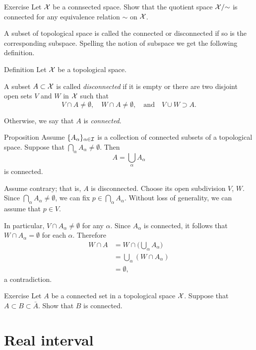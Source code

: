 \begin{thm}{Exercise}\label{ex:quotient-connected}
Let $\mathcal{X}$ be a connsected space.
Show that the quotient space $\mathcal{X}/{\sim}$ is connected for any equivalence relation $\sim$ on $\mathcal{X}$.
\end{thm}

A subset of topological space is called the connected or disconnected if so is the corresponding subspace.
Spelling the notion of subspace we get the following definition.

\begin{thm}{Definition}
Let $\mathcal{X}$ be a topological space.

A subset $A\subset \mathcal{X}$ is called \emph{disconnected} if it is empty or there are two disjoint open sets $V$ and $W$ in $\mathcal{X}$ such that 
\[V\cap A\ne\emptyset,\quad W\cap A\ne\emptyset,\quad\text{and}\quad V\cup W\supset A.\]

Otherwise, we say that $A$ is \emph{connected}.
\end{thm}

\begin{thm}{Proposition}\label{prop:union-connect}
Assume $\{A_\alpha\}_{\alpha\in\mathcal{I}}$ is a collection of connected subsets of a topological space.
Suppose that  $\bigcap_\alpha A_\alpha\ne\emptyset$.
Then 
\[A=\bigcup_\alpha A_\alpha\] 
is connected.
\end{thm}

Assume contrary; that is, $A$ is disconnected.
Choose its open subdivision $V$, $W$.
Since $\bigcap_\alpha A_\alpha\ne\emptyset$, we can fix $p\in \bigcap_\alpha A_\alpha$.
Without loss of generality, we can assume that $p\in V$.

In particular, $V\cap A_\alpha\ne\emptyset$ for any $\alpha$.
Since $A_\alpha$ is connected, it follows that $W\cap A_\alpha=\emptyset $ for each $\alpha$.
Therefore 
\begin{align*}
W\cap A&=W\cap\biggl(\bigcup_\alpha A_\alpha\biggr)
\\&=\bigcup_\alpha(W\cap A_\alpha)
\\&=\emptyset,
\end{align*}
a contradiction.
\qeds

\begin{thm}{Exercise}\label{ex:A<B<bar-A}
Let $A$ be a connected set in a topological space $\mathcal{X}$.
Suppose that $A\subset B\subset \bar A$.
Show that $B$ is connected.
\end{thm}


\section{Real interval}


